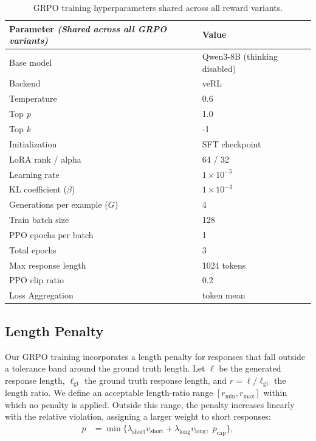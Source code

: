 \documentclass[11pt]{article}
\begin{document}
\begin{table}[t]
\centering
\small
\begin{tabular*}{\textwidth}{@{\extracolsep{\fill}}ll@{}}
\toprule
\textbf{Parameter} \emph{(Shared across all GRPO variants)} & \textbf{Value} \\
\midrule
Base model & Qwen3-8B (thinking disabled)\\
Backend & veRL \\
Temperature & 0.6 \\
Top \textit{p} & 1.0 \\
Top \textit{k} & -1 \\
Initialization & SFT checkpoint \\
LoRA rank / alpha & 64 / 32 \\
Learning rate & $1 \times 10^{-5}$ \\
KL coefficient ($\beta$) & $1 \times 10^{-3}$ \\
Generations per example ($G$) & 4 \\
Train batch size & 128 \\
PPO epochs per batch & 1 \\
Total epochs & 3 \\
Max response length & 1024 tokens \\
PPO clip ratio & 0.2 \\
Loss Aggregation & token mean \\

\bottomrule
\end{tabular*}
\caption{GRPO training hyperparameters shared across all reward variants.}
\label{tab:hyperparams}
\end{table}

\subsection{Length Penalty}
\label{app:length_penalty}

Our GRPO training incorporates a length penalty for responses that fall outside a tolerance band around the ground truth length.
Let $\ell$ be the generated response length, $\ell_{\mathrm{gt}}$ the ground truth response length, and $r = \ell / \ell_{\mathrm{gt}}$ the length ratio. We define an acceptable length-ratio range $[r_{\min}, r_{\max}]$ within which no penalty is applied. Outside this range, the penalty increases linearly with the relative violation, assigning a larger weight to short responses:
\begin{align}
p &= \min\{\lambda_{\mathrm{short}} v_{\mathrm{short}}
        + \lambda_{\mathrm{long}} v_{\mathrm{long}},\; p_{\mathrm{cap}}\},
\end{align}
\end{document}
